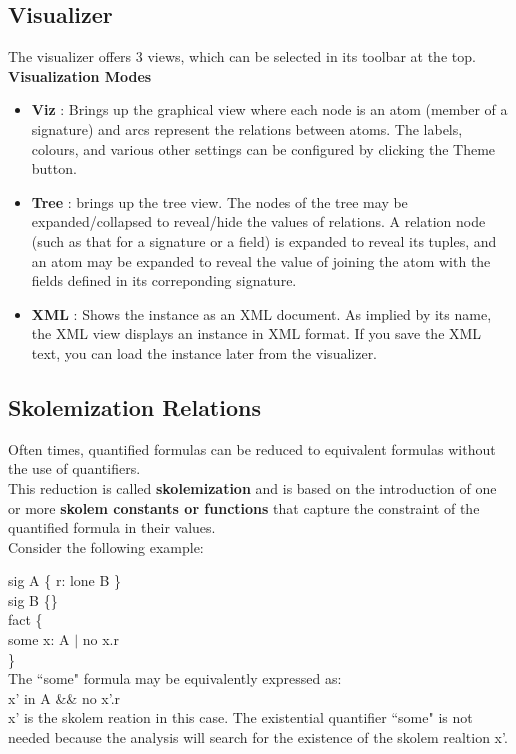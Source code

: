 \documentclass[a4paper,12pt]{extarticle}
\begin{document}
\subsection{Visualizer}
\label{visualiser}
The visualizer offers 3 views, which can be selected in its toolbar at the top.\\
\textbf{Visualization Modes}
\begin{itemize}
\item \textbf{Viz} : Brings up the graphical view where each node is an atom (member of a signature) and arcs represent the relations between atoms.
The labels, colours, and various other settings can be configured by clicking the Theme button.
\item \textbf{Tree} : brings up the tree view. The nodes of the tree may be expanded/collapsed to reveal/hide the values of relations. A relation node (such as that for a signature or a field) is expanded to reveal its tuples, and an atom may be expanded to reveal the value of joining the atom with the fields defined in its correponding signature.
\item \textbf{XML} : Shows the instance as an XML document. As implied by its name, the XML view displays an instance in XML format. If you save the XML text, you can load the instance later from the visualizer.
\end{itemize}
\subsection{Skolemization Relations }
\label{Skolemization relations}
Often times, quantified formulas can be reduced to equivalent formulas without the use of quantifiers.\\
This reduction is called \textbf{skolemization} and is based on the introduction of one or more \textbf{skolem constants or functions} that capture the constraint of the quantified formula in their values. \\
Consider the following example:

sig A \{ r: lone B \} \\

sig B \{\}\\

fact \{\\

    some x: A $|$ no x.r\\

\}\\
The ``some" formula may be equivalently expressed as: \\
    x' in A \&\& no x'.r \\
x' is the skolem reation in this case. The existential quantifier ``some" is not needed because the analysis will search for the existence of the skolem realtion x'.
\end{document}
